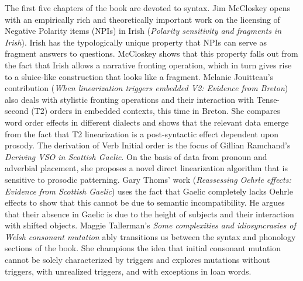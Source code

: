 \documentclass[output=paper]{langscibook}
\begin{document}
The first five chapters of the book are devoted to syntax. Jim McCloskey opens with an empirically rich and theoretically important work on the licensing of Negative Polarity items (NPIs) in Irish (\textit{Polarity sensitivity and fragments in Irish}). Irish has the typologically unique property that NPIs can serve as fragment answers to questions. McCloskey shows that this property falls out from the fact that Irish allows a narrative fronting operation, which in turn gives rise to a sluice-like construction that looks like a fragment. Melanie Jouitteau’s contribution (\textit{When linearization triggers embedded V2: Evidence from Breton}) also deals with stylistic fronting operations and their interaction with Tense-second (T2) orders in embedded contexts, this time in Breton. She compares word order effects in different dialects and shows that the relevant data emerge from the fact that T2 linearization is a post-syntactic effect dependent upon prosody. The derivation of Verb Initial order is the focus of Gillian Ramchand’s \textit{Deriving VSO in Scottish Gaelic}. On the basis of data from pronoun and adverbial placement, she proposes a novel direct linearization algorithm that is sensitive to prosodic patterning. Gary Thoms’ work (\textit{Reassessing Oehrle effects: Evidence from Scottish Gaelic}) uses the fact that Gaelic completely lacks Oehrle effects to show that this cannot be due to semantic incompatibility. He argues that their absence in Gaelic is due to the height of subjects and their interaction with shifted objects. Maggie Tallerman’s \textit{Some complexities and idiosyncrasies of Welsh consonant mutation} ably transitions us between the syntax and phonology sections of the book. She champions the idea that initial consonant mutation cannot be solely characterized by triggers and explores mutations without triggers, with unrealized triggers, and with exceptions in loan words.
\end{document}
